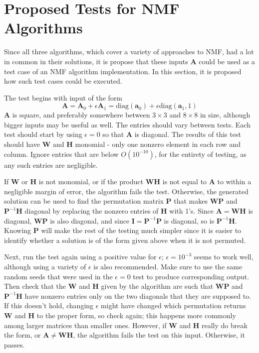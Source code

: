 \documentclass[conference]{IEEEtran}
\begin{document}
\section{Proposed Tests for NMF Algorithms}
Since all three algorithms, which cover a variety of approaches to NMF, had a lot in common in their solutions, it is propose that these inputs $ \mathbf{A} $ could be used as a test case of an NMF algorithm implementation.  In this section, it is proposed how such test cases could be executed.

The test begins with input of the form
\begin{equation}
\mathbf{A} = \mathbf{A}_0 + \epsilon \mathbf{A}_1 = \text{diag}(\mathbf{a}_0) + \epsilon \text{diag}(\mathbf{a}_1,1)
\end{equation}
$ \mathbf{A} $ is square, and preferably somewhere between $ 3 \times 3 $ and $ 8 \times 8 $ in size, although bigger inputs may be useful as well.  The entries should vary between tests.  Each test should start by using $ \epsilon = 0 $ so that $ \mathbf{A} $ is diagonal.  The results of this test should have $ \mathbf{W} $ and $ \mathbf{H} $ monomial - only one nonzero element in each row and column.  Ignore entries that are below $ O(10^{-10}) $, for the entirety of testing, as any such entries are negligible.

If $ \mathbf{W} $ or $ \mathbf{H} $ is not monomial, or if the product $ \mathbf{WH} $ is not equal to $ \mathbf{A} $ to within a negligible margin of error, the algorithm fails the test.  Otherwise, the generated solution can be used to find the permutation matrix $ \mathbf{P} $ that makes $ \mathbf{WP} $ and $ \mathbf{P}^{-1}\mathbf{H} $ diagonal by replacing the nonzero entries of $ \mathbf{H} $ with 1's.  Since $ \mathbf{A} = \mathbf{WH} $ is diagonal, $ \mathbf{WP} $ is also diagonal, and since $ \mathbf{I} = \mathbf{P}^{-1}\mathbf{P} $ is diagonal, so is $ \mathbf{P}^{-1}\mathbf{H} $.  Knowing $ \mathbf{P} $ will make the rest of the testing much simpler since it is easier to identify whether a solution is of the form given above when it is not permuted.

Next, run the test again using a positive value for $ \epsilon $; $ \epsilon = 10^{-3} $ seems to work well, although using a variety of $ \epsilon $ is also recommended.  Make sure to use the same random seeds that were used in the $ \epsilon = 0 $ test to produce corresponding output.  Then check that the $ \mathbf{W} $ and $ \mathbf{H} $ given by the algorithm are such that $ \mathbf{WP} $ and $ \mathbf{P}^{-1}\mathbf{H} $ have nonzero entries only on the two diagonals that they are supposed to.  If this doesn't hold, changing $ \epsilon $ might have changed which permutation returns $ \mathbf{W} $ and $ \mathbf{H} $ to the proper form, so check again; this happens more commonly among larger matrices than smaller ones.  However, if $ \mathbf{W} $ and $ \mathbf{H} $ really do break the form, or $ \mathbf{A} \neq \mathbf{WH} $, the algorithm fails the test on this input.  Otherwise, it passes.
\end{document}
